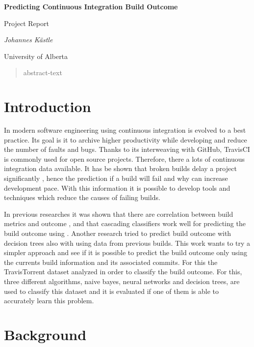 \documentclass[a4paper,11pt]{article}
\begin{document}
	
	\begin{center}
	{\huge\bfseries Predicting Continuous Integration Build Outcome \par}
	{\Large Project Report\par}
	
	\vspace{1cm}
	{\Large\itshape Johannes Kästle\par}
	{ University of Alberta \par}
	\end{center}


\setlength{\parindent}{0pt}
\setlength{\parskip}{1.5ex plus0.5ex minus0.5ex}

\begin{abstract}
	abstract-text %
\end{abstract}

\section{Introduction}

In modern software engineering using continuous integration is evolved to a best practice. Its goal is it to archive higher productivity while developing and reduce the number of faults and bugs. Thanks to its interweaving with GitHub, TravisCI is commonly used for open source projects. Therefore, there a lots of continuous integration data available. It has be shown that broken builds delay a project significantly \cite{CIDelay}, hence the prediction if a build will fail and why can increase development pace. With this information it is possible to develop tools and techniques which reduce the causes of failing builds. 

In previous researches it was shown that there are correlation between build metrics and outcome \cite{bibid}, and that cascading classifiers work well for predicting the build outcome using  \cite{bibid}. Another research tried to predict build outcome with decision trees also with using data from previous builds. This work wants to try a simpler approach and see if it is possible to predict the build outcome only using the currents build information and its associated commits. For this the TravisTorrent \cite{travisTorrent} dataset analyzed in order to classify the build outcome. For this, three different algorithms, naive bayes, neural networks and decision trees, are used to classify this dataset and it is evaluated if one of them is able to accurately learn this problem. 

\section{Background}
\end{document}
